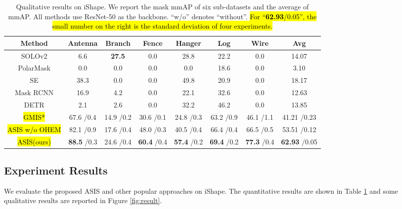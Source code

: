 \begin{table}[t]
\caption{Qualitative results on iShape. We report the mask mmAP of six sub-datasets and the average of mmAP. All methods use ResNet-50 as the backbone. ``w/o'' denotes ``without''. \hl{For ``\textbf{62.93}{\tiny /0.05}'', the small number on the right is the standard deviation of four experiments.}} 
    \centering
    \begin{tabular}{c|cccccc|c}
    \toprule[1.5pt]
        Method & Antenna & Branch & Fence & Hanger & Log & Wire & Avg\\
    \hline
        SOLOv2 \cite{wang2020solov2}      &  6.6 & \textbf{27.5} & 0.0 & 28.8 & 22.2 & 0.0 & 14.07\\
    \hline
        PolarMask \cite{xie2020polarmask}   &  0.0 & 0.0 & 0.0 & 0.0 & 18.6 & 0.0& 3.10\\
    \hline
        SE \cite{neven2019instance}  & 38.3 & 0.0 & 0.0 & 49.8 & 20.9 & 0.0 & 18.17 \\
    \hline
        Mask RCNN \cite{maskrcnn}   &  16.9 &  4.2 & 0.0 & 22.1 & 32.6 & 0.0 & 12.63\\
    \hline
        DETR \cite{carion2020endtoend}   &  2.1 &  2.6 & 0.0 & 32.2 & 46.2 & 0.0 & 13.85\\
    \midrule[1pt]
        
        \hl{GMIS* \cite{liu2018affinity}}    & 67.6 \tiny /0.4 &  14.9 \tiny /0.2 & 30.6 \tiny /0.1 & 24.8 \tiny /0.3 & 63.2 \tiny /0.9 & 46.1 \tiny /1.1 & 41.21 \tiny /0.23\\
    \hline
        \hl{ASIS w/o OHEM}    & 82.1 \tiny /0.9 & 17.6 \tiny /0.4 & 48.0 \tiny /0.3 & 40.5 \tiny /0.4 & 66.4 \tiny /0.4 & 66.5 \tiny /0.5 &  53.51 \tiny /0.12  \\
    \hline
        \hl{ASIS(ours)}   & \textbf{88.5} \tiny /0.3  & 24.6 \tiny /0.4  & \textbf{60.4} \tiny /0.4 & \textbf{57.4} \tiny /0.2 & \textbf{69.4} \tiny /0.2 & \textbf{77.3} \tiny /0.4 & \textbf{62.93} \tiny /0.05 \\

    \bottomrule[1.5pt]
    \end{tabular}
    \label{tab:11}
\end{table}


\subsection{Experiment Results}
We evaluate the proposed ASIS and other popular approaches on iShape. The quantitative results are shown in Table \ref{tab:11} and some qualitative results are reported in Figure \ref{fig:result}.

